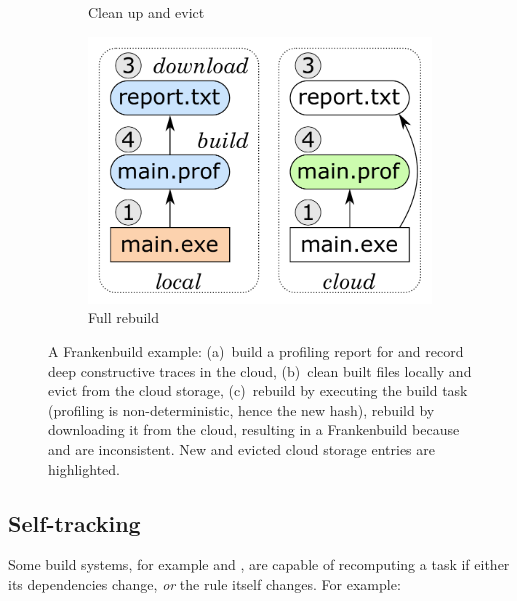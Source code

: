 \begin{figure}
\begin{subfigure}[b]{0.40\linewidth}
\vspace{-1mm}
\caption{Clean up and evict }
\end{subfigure}
\begin{subfigure}[b]{0.31\linewidth}
\centerline{\includegraphics[scale=0.28]{fig/frankenbuild-example-rebuild.pdf}}
\vspace{-1mm}
\caption{Full rebuild}
\end{subfigure}
\vspace{-2.5mm}
\caption{A Frankenbuild example: (a)~build a profiling report for 
and record deep constructive traces in the cloud, (b)~clean built files locally
and evict  from the cloud storage, (c)~rebuild  by
executing the build task (profiling is non-deterministic, hence the new hash),
rebuild  by downloading it from the cloud, resulting in a
Frankenbuild because  and  are inconsistent.
New and evicted cloud storage entries are highlighted.
\label{fig-frankenbuild}}
\vspace{-3mm}
\end{figure}

\subsection{Self-tracking}\label{sec-tracking-aspects}

Some build systems, for example \Excel and \Ninja, are capable of recomputing a
task if either its dependencies change, \emph{or} the rule itself changes. For
example:

